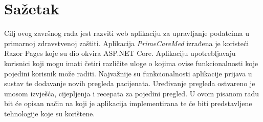 \section*{Sažetak}
\label{sec:summary}
Cilj ovog završnog rada jest razviti web aplikaciju za upravljanje podatcima u primarnoj zdravstvenoj zaštiti. Aplikacija \textit{PrimeCareMed} izrađena je koristeći Razor Pages koje su dio okvira ASP.NET Core. Aplikaciju upotrebljavaju korisnici koji mogu imati četiri različite uloge o kojima ovise funkcionalnosti koje pojedini korisnik može raditi. Najvažnije su funkcionalnosti aplikacije prijava u sustav te dodavanje novih pregleda pacijenata. Uređivanje pregleda ostvareno je unosom izvješća, cijepljenja i recepata za pojedini pregled. U ovom pisanom radu bit će opisan način na koji je aplikacija implementirana te će biti predstavljene tehnologije koje su korištene.
